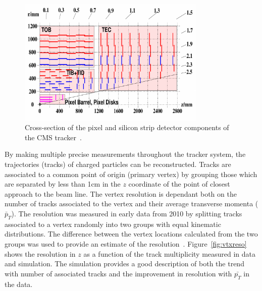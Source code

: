 \begin{figure}
	\centering
	\includegraphics[width=0.8\textwidth]{detector/trcker/trcker.pdf}
	\caption{Cross-section of the pixel and silicon strip detector 
	components of the CMS tracker~\citep{Weber201159}.}
   \label{fig:trackergeom}
\end{figure}

By making multiple precise measurements throughout the tracker system, the trajectories (tracks) of charged 
particles can be reconstructed.
Tracks are associated to a common point of origin (primary vertex) by grouping those which are separated
by less than 1cm in the $z$ coordinate of the point of closest approach to the beam line.
The vertex resolution is dependant both on the number of tracks associated to the vertex and
their average transverse momenta ($\bar{p}_{T}$). The resolution was measured in early data from 2010
by splitting tracks associated to a vertex randomly into two groups with equal kinematic distributions.
The difference between the vertex locations calculated from the two groups was used to provide an estimate 
of the resolution~\citep{TRK-10-005}.
Figure~\ref{fig:vtxreso} shows the resolution in $z$ as a function of the track multiplicity
measured in data and simulation. The simulation provides a good description of both the trend with 
number of associated tracks and the improvement in resolution with $\bar{p_{T}}$ in the data. 

